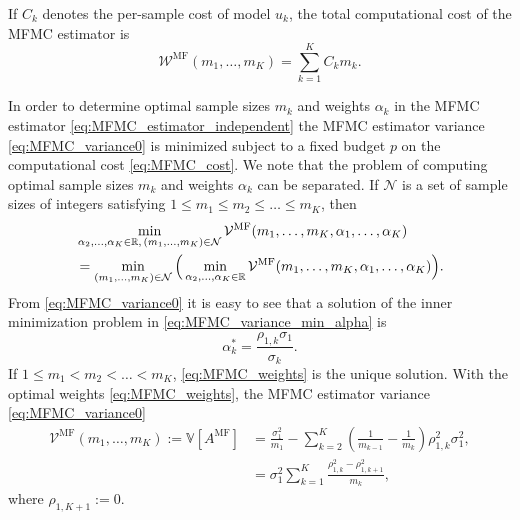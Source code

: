 If $C_k$ denotes the per-sample cost of model $u_k$, the total computational cost of the MFMC estimator  is 
\begin{equation}\label{eq:MFMC_cost}
        \mathcal{W}^{\text{MF}}(m_1, \ldots, m_K)  = \sum_{k=1}^K C_k m_k.
\end{equation}



In order to determine optimal sample sizes $m_k$ and weights $\alpha_k$ in the MFMC estimator \eqref{eq:MFMC_estimator_independent} the MFMC estimator  variance \eqref{eq:MFMC_variance0} 
is minimized subject to a fixed budget $p$ on the computational cost \eqref{eq:MFMC_cost}.
We note that the problem of computing optimal sample sizes $m_k$ and weights $\alpha_k$ 
can be separated. 
If ${\mathcal N}$ is a set of sample sizes of integers satisfying $1 \le m_1 \le m_2 \le \ldots \le m_K$,
then
\begin{align}   \label{eq:MFMC_variance_min_alpha}
    & \min_{\alpha_2, \ldots, \alpha_K \in \mathbb{R},\, (m_1, \ldots, m_K) \in {\mathcal N}} 
           \mathcal{V}^{\text{MF}}(m_1, \ldots, m_K, \alpha_1, \ldots, \alpha_K)                \nonumber \\
    & = \min_{(m_1, \ldots, m_K) \in {\mathcal N}} 
          \Big( \min_{\alpha_2, \ldots, \alpha_K \in \mathbb{R}} 
                       \mathcal{V}^{\text{MF}}(m_1, \ldots, m_K, \alpha_1, \ldots, \alpha_K)\Big).
\end{align}
From \eqref{eq:MFMC_variance0} it is easy to see that a solution of the  inner minimization problem in
\eqref{eq:MFMC_variance_min_alpha} is
\begin{equation}   \label{eq:MFMC_weights}
    \alpha_k^* = \frac{\rho_{1,k}\sigma_1}{\sigma_k}.
\end{equation}
If $1 \le m_1 < m_2 < \ldots < m_K$, \eqref{eq:MFMC_weights} is the unique solution.
With the optimal weights \eqref{eq:MFMC_weights}, the MFMC estimator  variance \eqref{eq:MFMC_variance0} 
\begin{subequations}  \label{eq:MFMC_variance}
\begin{align}
    \mathcal{V}^{\text{MF}}(m_1, \ldots, m_K)
    :=  \mathbb{V}[A^{\text{MF}}]
   & = \frac{\sigma_1^2}{m_1} 
       - \sum_{k=2}^K \left(\frac{1}{m_{k-1}} - \frac{1}{m_k}\right) \rho_{1,k}^2 \sigma_1^2,   \label{eq:MFMC_variance_a} \\
   &= \sigma_1^2\sum_{k=1}^K \frac{ \rho_{1,k}^2 - \rho_{1,k+1}^2}{m_k},           \label{eq:MFMC_variance_b}
\end{align}
\end{subequations}
where $\rho_{1,K+1} :=0$. 

